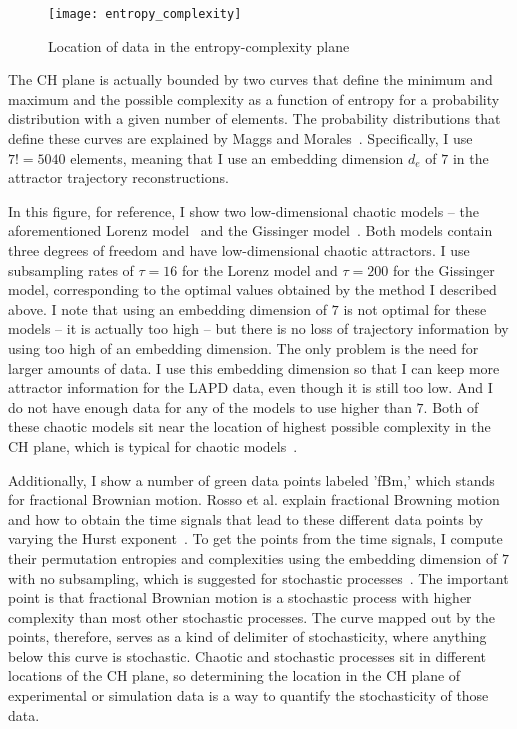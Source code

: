 \begin{figure}[!ht]
\centerline{\texttt{[image: entropy\_complexity]}}
\caption{Location of data in the entropy-complexity plane}
\label{entropy_complexity}
\end{figure}

The CH plane is actually bounded by two curves that define the minimum and maximum and the possible complexity as a function of entropy 
for a probability distribution with a given number of elements. The probability
distributions that define these curves are explained by Maggs and Morales~\cite{maggs2013}. Specifically, I use $7!=5040$ elements, meaning that I use an embedding dimension $d_e$ of $7$
in the attractor trajectory reconstructions.

In this figure, for reference, I show two low-dimensional chaotic models -- the aforementioned Lorenz model~\cite{lorenz1963} and the Gissinger model~\cite{gissinger2012}. 
Both models contain three degrees of freedom and have low-dimensional chaotic attractors. I use subsampling rates of $\tau=16$ for the Lorenz model and $\tau=200$ for the Gissinger model, corresponding
to the optimal values obtained by the method I described above. I note that using an embedding dimension of $7$ is not optimal for these models -- it is actually too high -- but there is no
loss of trajectory information by using too high of an embedding dimension. The only problem is the need for larger amounts of data. I use this embedding dimension so that I can keep more
attractor information for the LAPD data, even though it is still too low. And I do not have enough data for any of the models to use higher than $7$. Both of these chaotic models sit near the
location of highest possible complexity in the CH plane, which is typical for chaotic models~\cite{rosso2007}.

Additionally, I show a number of green data points labeled 'fBm,' which stands for fractional Brownian motion. Rosso et al. explain fractional Browning motion and how to obtain the time signals
that lead to these different data points by varying the Hurst exponent~\cite{rosso2007}. 
To get the points from the time signals, I compute their permutation entropies and complexities using the embedding dimension of $7$ with no subsampling,
which is suggested for stochastic processes~\cite{riedle2013}. The important point is that fractional Brownian motion is a stochastic process with higher complexity than most other stochastic
processes. The curve mapped out by the points, therefore, serves as a kind of delimiter of stochasticity, where anything below this curve is stochastic. Chaotic and stochastic processes
sit in different locations of the CH plane, so determining the location in the CH plane of experimental or simulation data is a way to quantify the stochasticity of those data.

